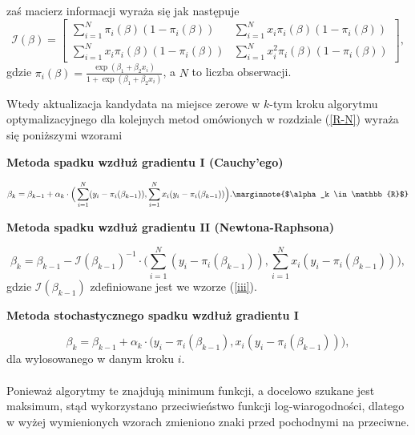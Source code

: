 zaś macierz informacji wyraża się jak następuje
\begin{equation}\label{iii}
\mathscr{I}(\beta) = 
\begin{bmatrix}
    \sum\limits_{i=1}^{N}\pi_i(\beta)(1-\pi_i(\beta))       & \sum\limits_{i=1}^{N}x_i\pi_i(\beta)(1-\pi_i(\beta)) \\
\sum\limits_{i=1}^{N}x_i\pi_i(\beta)(1-\pi_i(\beta)) & \sum\limits_{i=1}^{N}x_i^2\pi_i(\beta)(1-\pi_i(\beta)) 
\end{bmatrix},
\end{equation}
gdzie $\pi_i(\beta) = \frac{\exp(\beta_1+\beta_2x_i)}{1+\exp(\beta_1+\beta_2x_i)}$, a $N$ to liczba obserwacji.

Wtedy aktualizacja kandydata na miejsce zerowe w $k$-tym kroku algorytmu optymalizacyjnego dla kolejnych metod omówionych w rozdziale (\ref{R-N}) wyraża się poniższymi wzorami
\\
\begin{center}
\textbf{Metoda spadku wzdłuż gradientu I (Cauchy’ego)}
\end{center}
\begin{equation*}
\beta_{k} = \beta_{k-1} + \alpha_{k}\cdot\Big(\sum\limits_{i=1}^{N}(y_i-\pi_i(\beta_{k-1})), \sum\limits_{i=1}^{N}x_i(y_i-\pi_i(\beta_{k-1}))\Big).\marginnote{$\alpha_k \in \mathbb{R}$}
\end{equation*}
\begin{center}
\textbf{Metoda spadku wzdłuż gradientu II (Newtona-Raphsona)}
\end{center}
\begin{equation*}
\beta_{k} = \beta_{k-1} - \mathscr{I}(\beta_{k-1})^{-1}\cdot\Big(\sum\limits_{i=1}^{N}(y_i-\pi_i(\beta_{k-1})), \sum\limits_{i=1}^{N}x_i(y_i-\pi_i(\beta_{k-1}))\Big),
\end{equation*}
gdzie $\mathscr{I}(\beta_{k-1})$ zdefiniowane jest we wzorze (\ref{iii}). 
\begin{center}
\textbf{Metoda stochastycznego spadku wzdłuż gradientu I}
\end{center}
\begin{equation*}
\beta_{k} = \beta_{k-1} + \alpha_{k}\cdot\Big(y_i-\pi_i(\beta_{k-1}), x_i(y_i-\pi_i(\beta_{k-1}))\Big),
\end{equation*}
dla wylosowanego w danym kroku $i$.
\\ \ \\
Ponieważ algorytmy te znajdują minimum funkcji, a docelowo szukane jest maksimum, stąd wykorzystano przeciwieństwo funkcji log-wiarogodności, dlatego w wyżej wymienionych wzorach zmieniono znaki przed pochodnymi na przeciwne.

